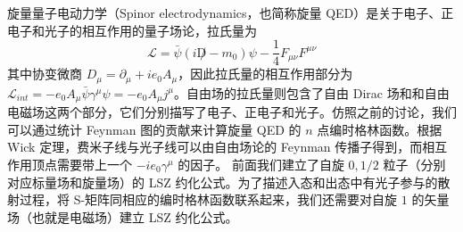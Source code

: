 
旋量量子电动力学（Spinor electrodynamics，也简称旋量 QED）是关于电子、正电子和光子的相互作用的量子场论，拉氏量为
\[
\mathcal{L}=\bar{\psi}(i\not D - m_0)\psi - \frac{1}{4}F_{\mu\nu}F^{\mu\nu}
\]
其中协变微商 $D_\mu=\partial_\mu+ie_0 A_\mu$，因此拉氏量的相互作用部分为 $\mathcal{L}_{int}=-e_0 A_\mu \bar\psi \gamma^\mu \psi=-e_0 A_\mu j^{\mu}$。自由场的拉氏量则包含了自由 Dirac 场和和自由电磁场这两个部分，它们分别描写了电子、正电子和光子。仿照之前的讨论，我们可以通过统计 Feynman 图的贡献来计算旋量 QED 的 $n$ 点编时格林函数。根据 Wick 定理，费米子线与光子线可以由自由场论的 Feynman 传播子得到，而相互作用顶点需要带上一个 $-ie_0 \gamma^\mu$ 的因子。
前面我们建立了自旋 $0,1/2$ 粒子（分别对应标量场和旋量场）的 LSZ 约化公式。为了描述入态和出态中有光子参与的散射过程，将 S-矩阵同相应的编时格林函数联系起来，我们还需要对自旋 $1$ 的矢量场（也就是电磁场）建立 LSZ 约化公式。
